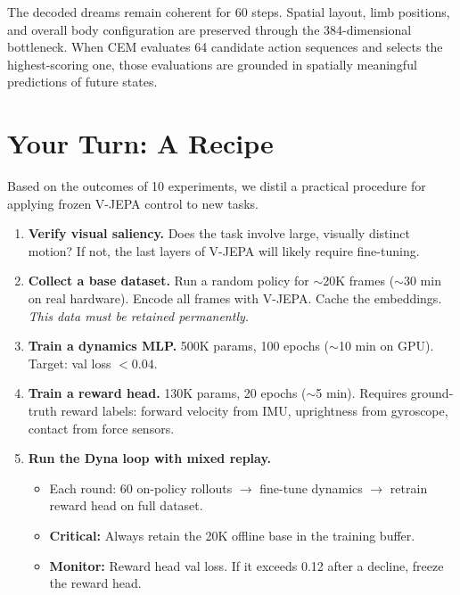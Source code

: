 \documentclass{article}
\begin{document}
The decoded dreams remain coherent for 60 steps. Spatial layout, limb positions, and overall body configuration are preserved through the 384-dimensional bottleneck. When CEM evaluates 64 candidate action sequences and selects the highest-scoring one, those evaluations are grounded in spatially meaningful predictions of future states.

\section{Your Turn: A Recipe}
\label{sec:recipe}

Based on the outcomes of 10 experiments, we distil a practical procedure for applying frozen V-JEPA control to new tasks.

\begin{breakthroughbox}
\begin{enumerate}
    \item \textbf{Verify visual saliency.} Does the task involve large, visually distinct motion? If not, the last layers of V-JEPA will likely require fine-tuning.
    \item \textbf{Collect a base dataset.} Run a random policy for $\sim$20K frames ($\sim$30 min on real hardware). Encode all frames with V-JEPA. Cache the embeddings. \emph{This data must be retained permanently.}
    \item \textbf{Train a dynamics MLP.} 500K params, 100 epochs ($\sim$10 min on GPU). Target: val loss $< 0.04$.
    \item \textbf{Train a reward head.} 130K params, 20 epochs ($\sim$5 min). Requires ground-truth reward labels: forward velocity from IMU, uprightness from gyroscope, contact from force sensors.
    \item \textbf{Run the Dyna loop with mixed replay.}
    \begin{itemize}
        \item Each round: 60 on-policy rollouts $\rightarrow$ fine-tune dynamics $\rightarrow$ retrain reward head on full dataset.
        \item \textbf{Critical:} Always retain the 20K offline base in the training buffer.
        \item \textbf{Monitor:} Reward head val loss. If it exceeds 0.12 after a decline, freeze the reward head.
    \end{itemize}
\end{enumerate}
\end{breakthroughbox}
\end{document}
